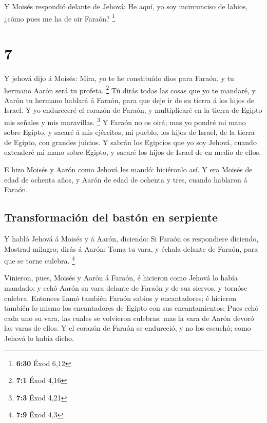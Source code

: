  Y Moisés respondió delante de Jehová: He aquí, yo soy
incircunciso de labios, ¿cómo pues me ha de oir Faraón? \footnote{\textbf{6:30}
  Éxod 6,12}

\hypertarget{section-6}{%
\section{7}\label{section-6}}

 Y jehová dijo á Moisés: Mira, yo te he constituído dios
para Faraón, y tu hermano Aarón será tu profeta. \footnote{\textbf{7:1}
  Éxod 4,16}  Tú dirás todas las cosas que yo te mandaré, y
Aarón tu hermano hablará á Faraón, para que deje ir de su tierra á los
hijos de Israel.  Y yo endureceré el corazón de Faraón, y
multiplicaré en la tierra de Egipto mis señales y mis maravillas.
\footnote{\textbf{7:3} Éxod 4,21}  Y Faraón no os oirá; mas
yo pondré mi mano sobre Egipto, y sacaré á mis ejércitos, mi pueblo, los
hijos de Israel, de la tierra de Egipto, con grandes juicios.
 Y sabrán los Egipcios que yo soy Jehová, cuando extenderé
mi mano sobre Egipto, y sacaré los hijos de Israel de en medio de ellos.

 E hizo Moisés y Aarón como Jehová les mandó: hiciéronlo
así.  Y era Moisés de edad de ochenta años, y Aarón de edad
de ochenta y tres, cuando hablaron á Faraón.

\hypertarget{transformaciuxf3n-del-bastuxf3n-en-serpiente}{%
\subsection{Transformación del bastón en
serpiente}\label{transformaciuxf3n-del-bastuxf3n-en-serpiente}}

 Y habló Jehová á Moisés y á Aarón, diciendo: 
Si Faraón os respondiere diciendo, Mostrad milagro; dirás á Aarón: Toma
tu vara, y échala delante de Faraón, para que se torne culebra.
\footnote{\textbf{7:9} Éxod 4,3}

 Vinieron, pues, Moisés y Aarón á Faraón, é hicieron como
Jehová lo había mandado: y echó Aarón su vara delante de Faraón y de sus
siervos, y tornóse culebra.  Entonces llamó también Faraón
sabios y encantadores; é hicieron también lo mismo los encantadores de
Egipto con sus encantamientos;  Pues echó cada uno su vara,
las cuales se volvieron culebras: mas la vara de Aarón devoró las varas
de ellos.  Y el corazón de Faraón se endureció, y no los
escuchó; como Jehová lo había dicho.

